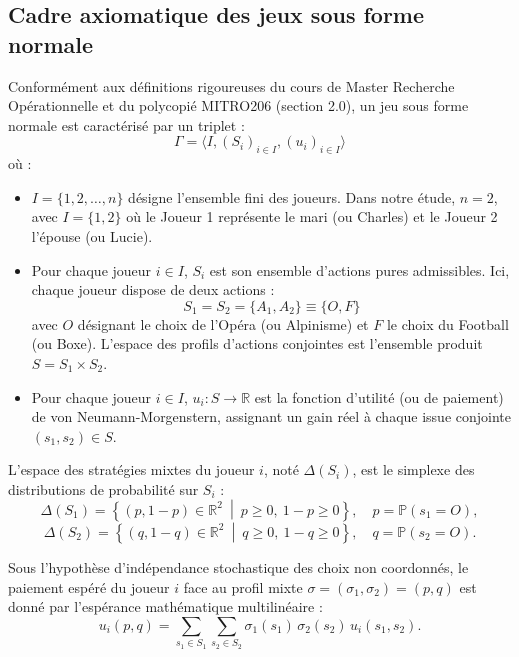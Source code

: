 \documentclass[11pt,a4paper]{article}
\begin{document}
\subsection{Cadre axiomatique des jeux sous forme normale}
Conformément aux définitions rigoureuses du cours de Master Recherche Opérationnelle et du polycopié MITRO206 (section 2.0), un jeu sous forme normale est caractérisé par un triplet :
\begin{equation}
\Gamma = \langle I, (S_i)_{i \in I}, (u_i)_{i \in I} \rangle
\end{equation}
où :
\begin{itemize}[leftmargin=1.5em]
    \item $I = \{1, 2, \dots, n\}$ désigne l'ensemble fini des joueurs. Dans notre étude, $n = 2$, avec $I = \{1, 2\}$ où le Joueur 1 représente le mari (ou Charles) et le Joueur 2 l'épouse (ou Lucie).
    \item Pour chaque joueur $i \in I$, $S_i$ est son ensemble d'actions pures admissibles. Ici, chaque joueur dispose de deux actions :
    \[
    S_1 = S_2 = \{A_1, A_2\} \equiv \{O, F\}
    \]
    avec $O$ désignant le choix de l'Opéra (ou Alpinisme) et $F$ le choix du Football (ou Boxe). L'espace des profils d'actions conjointes est l'ensemble produit $S = S_1 \times S_2$.
    \item Pour chaque joueur $i \in I$, $u_i : S \to \mathbb{R}$ est la fonction d'utilité (ou de paiement) de von Neumann-Morgenstern, assignant un gain réel à chaque issue conjointe $(s_1, s_2) \in S$.
\end{itemize}

L'espace des stratégies mixtes du joueur $i$, noté $\Delta(S_i)$, est le simplexe des distributions de probabilité sur $S_i$ :
\begin{equation}
\Delta(S_1) = \left\{ (p, 1-p) \in \mathbb{R}^2 \ \middle|\ p \ge 0, \ 1-p \ge 0 \right\}, \quad p = \mathbb{P}(s_1 = O),
\end{equation}
\begin{equation}
\Delta(S_2) = \left\{ (q, 1-q) \in \mathbb{R}^2 \ \middle|\ q \ge 0, \ 1-q \ge 0 \right\}, \quad q = \mathbb{P}(s_2 = O).
\end{equation}

Sous l'hypothèse d'indépendance stochastique des choix non coordonnés, le paiement espéré du joueur $i$ face au profil mixte $\sigma = (\sigma_1, \sigma_2) = (p, q)$ est donné par l'espérance mathématique multilinéaire :
\begin{equation}
u_i(p, q) = \sum_{s_1 \in S_1} \sum_{s_2 \in S_2} \sigma_1(s_1) \, \sigma_2(s_2) \, u_i(s_1, s_2).
\end{equation}
\end{document}
